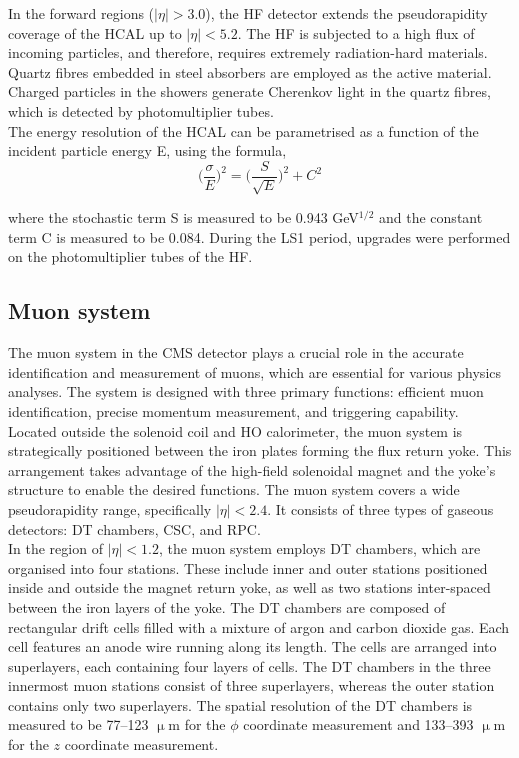 In the forward regions ($|\eta| > 3.0$), the \ac{HF} detector extends the pseudorapidity coverage of the \ac{HCAL} up to $|\eta| < 5.2$. 
The \ac{HF} is subjected to a high flux of incoming particles, and therefore, requires extremely radiation-hard materials. 
Quartz fibres embedded in steel absorbers are employed as the active material. Charged particles in the showers generate Cherenkov light in the quartz fibres, which is detected by photomultiplier tubes. \\

The energy resolution of the \ac{HCAL} can be parametrised as a function of the incident particle energy E, using the formula, 
\begin{equation}
\Big(\frac{\sigma}{E}\Big)^2 = \Big(\frac{S}{\sqrt{E}}\Big)^2 + C^2
\end{equation}

where the stochastic term S is measured to be 0.943 GeV${^{1/2}}$ and the constant term C is measured to be 0.084.
During the \ac{LS1} period, upgrades were performed on the photomultiplier tubes of the \ac{HF}.

\subsection{Muon system}

The muon system in the \ac{CMS} detector plays a crucial role in the accurate identification and measurement of muons, which are essential for various physics analyses. 
The system is designed with three primary functions: efficient muon identification, precise momentum measurement, and triggering capability. \\

Located outside the solenoid coil and \ac{HO} calorimeter, the muon system is strategically positioned between the iron plates forming the flux return yoke. 
This arrangement takes advantage of the high-field solenoidal magnet and the yoke's structure to enable the desired functions.
The muon system covers a wide pseudorapidity range, specifically $|\eta| < 2.4$. 
It consists of three types of gaseous detectors: \ac{DT} chambers, \ac{CSC}, and \ac{RPC}. \\

In the region of $|\eta| < 1.2$, the muon system employs \ac{DT} chambers, which are organised into four stations. 
These include inner and outer stations positioned inside and outside the magnet return yoke, as well as two stations inter-spaced between the iron layers of the yoke. 
The \ac{DT} chambers are composed of rectangular drift cells filled with a mixture of argon and carbon dioxide gas. 
Each cell features an anode wire running along its length. 
The cells are arranged into superlayers, each containing four layers of cells. 
The \ac{DT} chambers in the three innermost muon stations consist of three superlayers, whereas the outer station contains only two superlayers. 
The spatial resolution of the \ac{DT} chambers is measured to be 77–123 $\upmu$m for the $\phi$ coordinate measurement and 133–393 $\upmu$m for the $z$ coordinate measurement. \\

